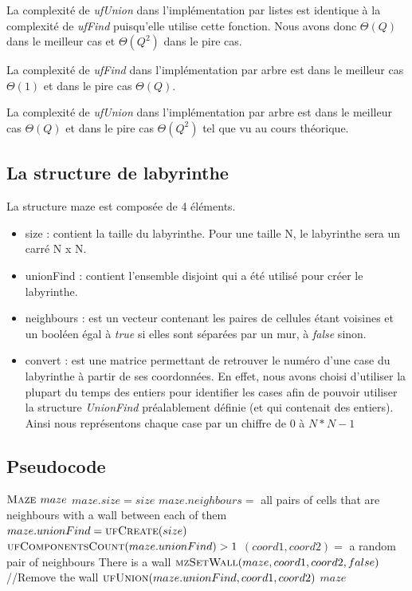 La complexité de \textit{ufUnion} dans l'implémentation par listes est identique à la complexité de \textit{ufFind} puisqu'elle utilise cette fonction. Nous avons donc $\Theta(Q)$ dans le meilleur cas et $\Theta(Q^2)$ dans le pire cas.
\newline

La complexité de \textit{ufFind} dans l'implémentation par arbre est dans le meilleur cas $\Theta(1)$ et dans le pire cas $\Theta(Q)$.

La complexité de \textit{ufUnion} dans l'implémentation par arbre est dans le meilleur cas $\Theta(Q)$ et dans le pire cas $\Theta(Q^2)$ tel que vu au cours théorique.




\subsection{La structure de labyrinthe} %
La structure maze est composée de 4 éléments.
\begin{itemize}
\item size : contient la taille du labyrinthe. Pour une taille N, le labyrinthe sera un carré N x N.
\item unionFind : contient l'ensemble disjoint qui a été utilisé pour créer le labyrinthe.
\item neighbours : est un vecteur contenant les paires de cellules étant voisines et un booléen égal à \textit{true} si elles sont séparées par un mur, à \textit{false} sinon.
\item convert : est une matrice permettant de retrouver le numéro d'une case du labyrinthe à partir de ses coordonnées.
\bigbreak
En effet, nous avons choisi d'utiliser la plupart du temps des entiers pour identifier les cases afin de pouvoir utiliser la structure \textit{UnionFind} préalablement définie (et qui contenait des entiers). Ainsi nous représentons chaque case par un chiffre de $0$ à $N *N - 1$
\end{itemize}

\subsection{Pseudocode} %
\begin{codebox}
\li $\textnormal{\scshape Maze } maze$
\li $maze.size = size$
\li $maze.neighbours =$ all pairs of cells that are neighbours with a wall between each of them
\li $maze.unionFind = \textnormal{\scshape ufCreate}(size)$
\li \While $\textnormal{\scshape ufComponentsCount}(maze.unionFind) > 1$
\Do
\li 	$(coord1, coord2) =$ a random pair of neighbours
\li		\If There is a wall
\li \Then $\textnormal{\scshape mzSetWall}(maze, coord1, coord2, false)$ //Remove the wall
\li	$\textnormal{\scshape ufUnion}(maze.unionFind, coord1, coord2)$
\End
\End
\li \Return $maze$
\End
\end{codebox}


